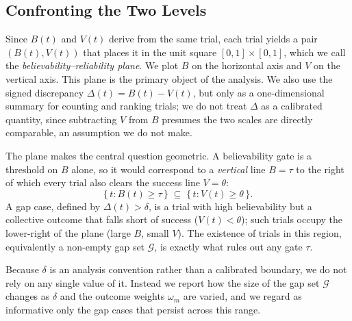 \documentclass[runningheads]{llncs}
\begin{document}




\subsection{Confronting the Two Levels}\label{sec:confront}
Since $B(t)$ and $V(t)$ derive from the same trial, each trial yields a pair $(B(t),V(t))$ that
places it in the unit square $[0,1]\times[0,1]$, which we call the \emph{believability--reliability
plane}. We plot $B$ on the horizontal axis and $V$ on the vertical axis. This plane is the primary
object of the analysis. We also use the signed discrepancy $\Delta(t)=B(t)-V(t)$, but only as a
one-dimensional summary for counting and ranking trials; we do not treat $\Delta$ as a calibrated
quantity, since subtracting $V$ from $B$ presumes the two scales are directly comparable, an
assumption we do not make.

The plane makes the central question geometric. A believability gate is a threshold on $B$ alone,
so it would correspond to a \emph{vertical} line $B=\tau$ to the right of which every trial also
clears the success line $V=\theta$:
\[
\{\,t : B(t)\geq\tau\,\} \;\subseteq\; \{\,t : V(t)\geq\theta\,\}.
\]
A gap case, defined by $\Delta(t)>\delta$, is a trial with high believability but a collective
outcome that falls short of success ($V(t)<\theta$); such trials occupy the lower-right of the plane
(large $B$, small $V$). The existence of trials in this region, equivalently a non-empty gap set
$\mathcal{G}$, is exactly what rules out any gate $\tau$.

Because $\delta$ is an analysis convention rather than a calibrated boundary, we do not rely on any
single value of it. Instead we report how the size of the gap set $\mathcal{G}$ changes as $\delta$
and the outcome weights $\omega_m$ are varied, and we regard as informative only the gap cases that
persist across this range.
\end{document}
